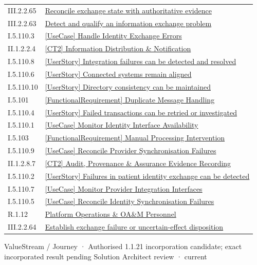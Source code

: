 \begin{longtable}{p{.22\linewidth}p{.73\linewidth}}
III.2.2.65 & \hyperref[element:08c2d05dd0174cc28288ed4ab0bc05d2]{Reconcile exchange state with authoritative evidence} \\
III.2.2.63 & \hyperref[element:0e171ae23faf436a90fe7a85889acd5c]{Detect and qualify an information exchange problem} \\
I.5.110.3 & \hyperref[element:15e2c6ddf11645c380e132ffd66a33e8]{[UseCase] Handle Identity Exchange Errors} \\
II.1.2.2.4 & \hyperref[element:1c2aad9aca7242149b4f30045c42711f]{[CT2] Information Distribution \& Notification} \\
I.5.110.8 & \hyperref[element:337a485913a741aebf8174a029fe389f]{[UserStory] Integration failures can be detected and resolved} \\
I.5.110.6 & \hyperref[element:4ea274597d7b49d3b711e44bc7e091ef]{[UserStory] Connected systems remain aligned} \\
I.5.110.10 & \hyperref[element:74a758ac6bc649bfad23a9ece17b5171]{[UserStory] Directory consistency can be maintained} \\
I.5.101 & \hyperref[element:76a67526fcdf40999f375a8cac54d5ef]{[FunctionalRequirement] Duplicate Message Handling} \\
I.5.110.4 & \hyperref[element:8db2df3bad344154b4d4c4ea80efa046]{[UserStory] Failed transactions can be retried or investigated} \\
I.5.110.1 & \hyperref[element:8ead3dc123174f19b39dd819096002e4]{[UseCase] Monitor Identity Interface Availability} \\
I.5.103 & \hyperref[element:911511665a8a4135b7f2a37f5f79ad36]{[FunctionalRequirement] Manual Processing Intervention} \\
I.5.110.9 & \hyperref[element:a806fe843b844051aeed31ceb746c7c0]{[UseCase] Reconcile Provider Synchronisation Failures} \\
II.1.2.8.7 & \hyperref[element:adf5e2bc81b4468d9bb486b1d77bf92b]{[CT2] Audit, Provenance \& Assurance Evidence Recording} \\
I.5.110.2 & \hyperref[element:b39693a84d6146299a045c2d8901d31e]{[UserStory] Failures in patient identity exchange can be detected} \\
I.5.110.7 & \hyperref[element:bec4851b7ddc4d4aa4913553313dce74]{[UseCase] Monitor Provider Integration Interfaces} \\
I.5.110.5 & \hyperref[element:e79879ad407c45ee9a785b729cbd072b]{[UseCase] Reconcile Identity Synchronisation Failures} \\
R.1.12 & \hyperref[element:ec45ffa1b7d841cf920aa467d4d2b1f4]{Platform Operations \& OA\&M Personnel} \\
III.2.2.64 & \hyperref[element:f49ed7138ad1435a94cb1f509aaf0b8d]{Establish exchange failure or uncertain-effect disposition} \\
\end{longtable}
\label{element:ad3479bfcefb4cc4b562e146f68eb579}
{\small ValueStream / Journey · Authorised 1.1.21 incorporation candidate; exact incorporated result pending Solution Architect review · current}\par

